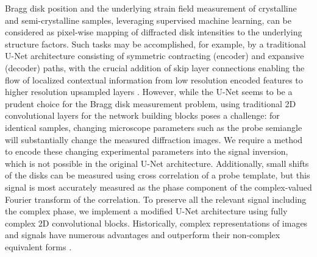 \documentclass[%
 reprint,
superscriptaddress,
 amsmath,
 amssymb,
 prl,
]{revtex4-2}
\begin{document}
Bragg disk position and the underlying strain field measurement of crystalline and semi-crystalline samples, leveraging supervised machine learning, can be considered as pixel-wise mapping of diffracted disk intensities to the underlying structure factors. Such tasks may be accomplished, for example, by a traditional U-Net architecture consisting of symmetric contracting (encoder) and expansive (decoder) paths, with the crucial addition of skip layer connections enabling the flow of localized contextual information from low resolution encoded features to higher resolution upsampled layers \citep{ronneberger2015unet}. %
However, while the U-Net seems to be a prudent choice for the Bragg disk measurement problem, using traditional 2D convolutional layers for the network building blocks poses a challenge: for identical samples, changing microscope parameters such as the probe semiangle will substantially change the measured diffraction images. We require a method to encode these changing experimental parameters into the signal inversion, which is not possible in the original U-Net architecture. Additionally, small shifts of the disks can be measured  using cross correlation of a probe template, but this signal is most accurately measured as the phase component of the complex-valued Fourier transform of the correlation. To preserve all the relevant signal including the complex phase, we implement a modified U-Net architecture using fully complex 2D convolutional blocks. Historically, complex representations of images and signals have numerous advantages and outperform their non-complex equivalent forms \cite{danihelka2016associative,arjovsky2016unitary, wisdom2016full, sampat2009complex}. 


\end{document}
